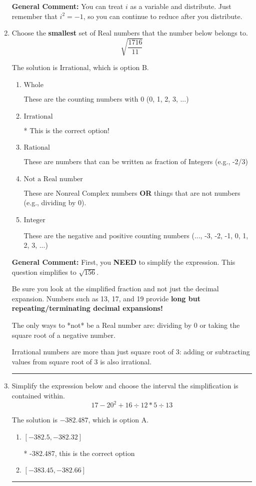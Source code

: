 \documentclass{extbook}[14pt]
\newcommand{\litem}[1]{\item #1

\rule{\textwidth}{0.4pt}}
\begin{document}
\begin{enumerate}
{\textbf{General Comment:} You can treat $i$ as a variable and distribute. Just remember that $i^2=-1$, so you can continue to reduce after you distribute.
}
\litem{
Choose the \textbf{smallest} set of Real numbers that the number below belongs to.
\[ \sqrt{\frac{1716}{11}} \]

The solution is \( \text{Irrational} \), which is option B.\begin{enumerate}[label=\Alph*.]
\item \( \text{Whole} \)

These are the counting numbers with 0 (0, 1, 2, 3, ...)
\item \( \text{Irrational} \)

* This is the correct option!
\item \( \text{Rational} \)

These are numbers that can be written as fraction of Integers (e.g., -2/3)
\item \( \text{Not a Real number} \)

These are Nonreal Complex numbers \textbf{OR} things that are not numbers (e.g., dividing by 0).
\item \( \text{Integer} \)

These are the negative and positive counting numbers (..., -3, -2, -1, 0, 1, 2, 3, ...)
\end{enumerate}

\textbf{General Comment:} First, you \textbf{NEED} to simplify the expression. This question simplifies to $\sqrt{156}$. 
 
 Be sure you look at the simplified fraction and not just the decimal expansion. Numbers such as 13, 17, and 19 provide \textbf{long but repeating/terminating decimal expansions!} 
 
 The only ways to *not* be a Real number are: dividing by 0 or taking the square root of a negative number. 
 
 Irrational numbers are more than just square root of 3: adding or subtracting values from square root of 3 is also irrational.
}
\litem{
Simplify the expression below and choose the interval the simplification is contained within.
\[ 17 - 20^2 + 16 \div 12 * 5 \div 13 \]

The solution is \( -382.487 \), which is option A.\begin{enumerate}[label=\Alph*.]
\item \( [-382.5, -382.32] \)

* -382.487, this is the correct option
\item \( [-383.45, -382.66] \)


\end{enumerate}}
\end{enumerate}
\end{document}
